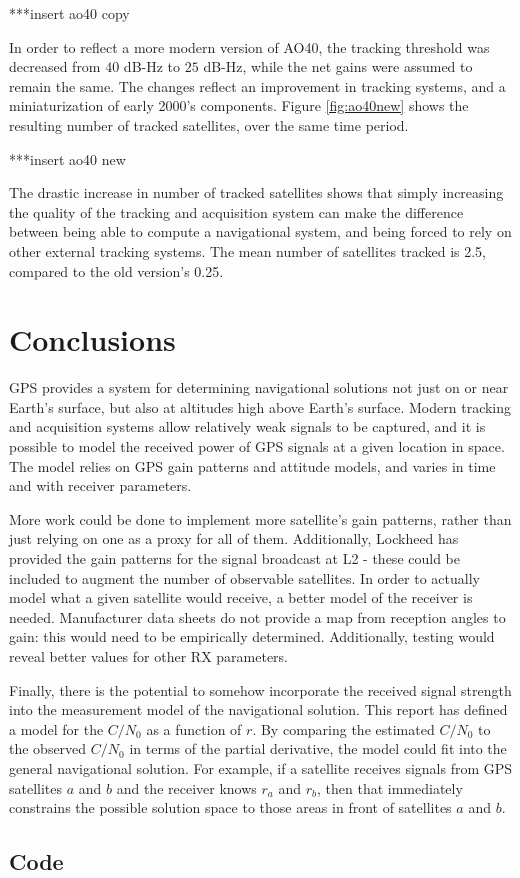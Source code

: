 \documentclass[11pt]{article}
\newcommand{\cnr}{C/N_0}
\begin{document}
***insert ao40 copy

In order to reflect a more modern version of AO40, the tracking threshold was decreased from $40$ dB-Hz to $25$ dB-Hz, while the net gains were assumed to remain the same. The changes reflect an improvement in tracking systems, and a miniaturization of early 2000's components. Figure \ref{fig:ao40new} shows the resulting number of tracked satellites, over the same time period.

***insert ao40 new

The drastic increase in number of tracked satellites shows that simply increasing the quality of the tracking  and acquisition system can make the difference between being able to compute a navigational system, and being forced to rely on other external tracking systems. The mean number of satellites tracked is 2.5, compared to the old version's 0.25.


\section{Conclusions}
GPS provides a system for determining navigational solutions not just on or near Earth's surface, but also at altitudes high above Earth's surface. Modern tracking and acquisition systems allow relatively weak signals to be captured, and it is possible to model the received power of GPS signals at a given location in space. The model relies on GPS gain patterns and attitude models, and varies in time and with receiver parameters. 

More work could be done to implement more satellite's gain patterns, rather than just relying on one as a proxy for all of them. Additionally, Lockheed has provided the gain patterns for the signal broadcast at L2 - these could be included to augment the number of observable satellites. In order to actually model what a given satellite would receive, a better model of the receiver is needed. Manufacturer data sheets do not provide a map from reception angles to gain: this would need to be empirically determined. Additionally, testing would reveal better values for other RX parameters.

Finally, there is the potential to somehow incorporate the received signal strength into the measurement model of the navigational solution. This report has defined a model for the $\cnr$ as a function of $r$. By comparing the estimated $\cnr$ to the observed $\cnr$ in terms of the partial derivative, the model could fit into the general navigational solution. For example, if a satellite receives signals from GPS satellites $a$ and $b$ and the receiver knows $r_a$ and $r_b$, then that immediately constrains the possible solution space to those areas in front of satellites $a$ and $b$. 

\pagebreak

\begin{appendices}
\section{Code}
%
%

  
\end{appendices} 
\end{document}
